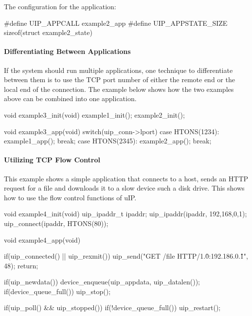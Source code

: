 \-The configuration for the application\-:


\begin{DoxyCode}
#define UIP_APPCALL       example2_app
#define UIP_APPSTATE_SIZE sizeof(struct example2_state)
\end{DoxyCode}
\hypertarget{a00060_example3}{}\paragraph{\-Differentiating Between Applications}\label{a00060_example3}
\-If the system should run multiple applications, one technique to differentiate between them is to use the \-T\-C\-P port number of either the remote end or the local end of the connection. \-The example below shows how the two examples above can be combined into one application.


\begin{DoxyCode}
void example3_init(void) {
   example1_init();
   example2_init();   
}

void example3_app(void) {
   switch(uip_conn->lport) {
   case HTONS(1234):
      example1_app();
      break;
   case HTONS(2345):
      example2_app();
      break;
   }
}
\end{DoxyCode}
\hypertarget{a00060_example4}{}\paragraph{\-Utilizing T\-C\-P Flow Control}\label{a00060_example4}
\-This example shows a simple application that connects to a host, sends an \-H\-T\-T\-P request for a file and downloads it to a slow device such a disk drive. \-This shows how to use the flow control functions of u\-I\-P.


\begin{DoxyCode}
void example4_init(void) {
   uip_ipaddr_t ipaddr;
   uip_ipaddr(ipaddr, 192,168,0,1);
   uip_connect(ipaddr, HTONS(80));
}

void example4_app(void) {
   if(uip_connected() || uip_rexmit()) {
      uip_send("GET /file HTTP/1.0\r\nServer:192.186.0.1\r\n\r\n",
               48);
      return;
   }

   if(uip_newdata()) {
      device_enqueue(uip_appdata, uip_datalen());
      if(device_queue_full()) {
         uip_stop();
      }
   }

   if(uip_poll() && uip_stopped()) {
      if(!device_queue_full()) {
         uip_restart();
      }
   }
}
\end{DoxyCode}


